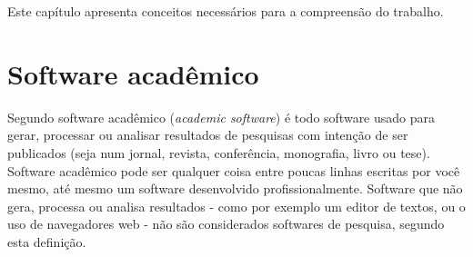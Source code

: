 



{Este capítulo apresenta conceitos necessários para a compreensão do trabalho.}
\label{fundamentacao}

%
%

\section{Software acadêmico}

Segundo  software acadêmico ({\it academic
software}) é todo software usado para gerar, processar ou analisar resultados
de pesquisas com intenção de ser publicados (seja num jornal, revista,
conferência, monografia, livro ou tese). Software acadêmico pode ser qualquer
coisa entre poucas linhas escritas por você mesmo, até mesmo um software
desenvolvido profissionalmente. Software que não gera, processa ou analisa
resultados - como por exemplo um editor de textos, ou o uso de navegadores web
- não são considerados softwares de pesquisa, segundo esta definição.

